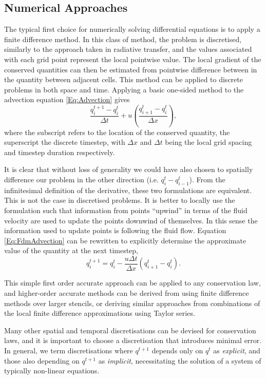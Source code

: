 \subsection{Numerical Approaches}

The typical first choice for numerically solving differential equations is to apply a finite difference method.
In this class of method, the problem is discretised, similarly to the approach taken in radiative transfer, and the values associated with each grid point represent the local pointwise value.
The local gradient of the conserved quantities can then be estimated from pointwise difference between in the quantity between adjacent cells.
This method can be applied to discrete problems in both space and time.
Applying a basic one-sided method to the advection equation \eqref{Eq:Advection} gives
\begin{equation}\label{Eq:FdmAdvection}
    \frac{q^{t+1}_i - q^t_i}{\Delta t} + u\left( \frac{q^t_{i+1} - q^t_i}{\Delta x} \right),
\end{equation}
where the subscript refers to the location of the conserved quantity, the superscript the discrete timestep, with $\Delta x$ and $\Delta t$ being the local grid spacing and timestep duration respectively.

It is clear that without loss of generality we could have also chosen to spatially difference our problem in the other direction (i.e. $q^t_i - q^t_{i-1}$).
From the infinitesimal definition of the derivative, these two formulations are equivalent.
This is not the case in discretised problems.
It is better to locally use the formulation such that information from points ``upwind'' in terms of the fluid velocity are used to update the points downwind of themselves.
In this sense the information used to update points is following the fluid flow.
Equation \eqref{Eq:FdmAdvection} can be rewritten to explicitly determine the approximate value of the quantity at the next timestep,
\begin{equation}
    q^{t+1}_i = q^t_i - \frac{u \Delta t}{\Delta x}\left( q^t_{i+1} - q^t_i \right).
\end{equation}

This simple first order accurate approach can be applied to any conservation law, and higher-order accurate methods can be derived from using finite difference methods over larger stencils, or deriving similar approaches from combinations of the local finite difference approximations using Taylor series.

Many other spatial and temporal discretisations can be devised for conservation laws, and it is important to choose a discretisation that introduces minimal error.
In general, we term discretisations where $q^{t+1}$ depends only on $q^{t}$ as \emph{explicit}, and those also depending on $q^{t+1}$ as \emph{implicit}, necessitating the solution of a system of typically non-linear equations.

